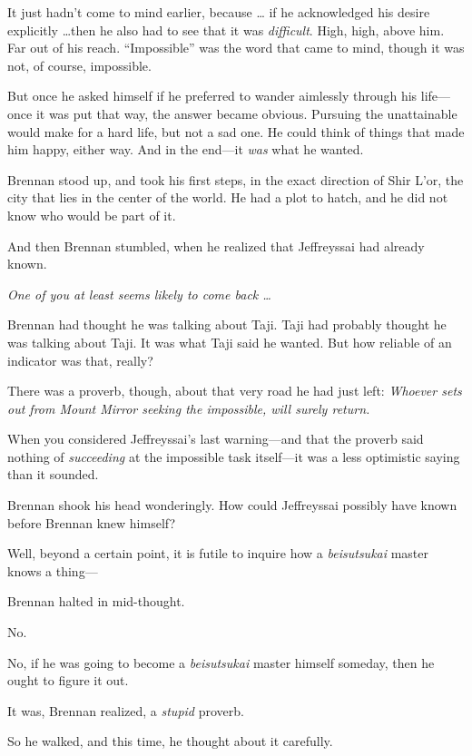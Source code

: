 {
 It just hadn't come to mind earlier, because \ldots
if he acknowledged his desire explicitly \ldots then he also had to see
that it was \textit{difficult}. High, high, above him. Far out of his
reach. ``Impossible'' was the word
that came to mind, though it was not, of course, impossible.}

{
 But once he asked himself if he preferred to wander aimlessly
through his life---once it was put that way, the answer became obvious.
Pursuing the unattainable would make for a hard life, but not a sad
one. He could think of things that made him happy, either way. And in
the end---it \textit{was} what he wanted.}

{
 Brennan stood up, and took his first steps, in the exact direction
of Shir L'or, the city that lies in the center of the
world. He had a plot to hatch, and he did not know who would be part of
it.}

{
 And then Brennan stumbled, when he realized that Jeffreyssai had
already known.}

{
 \textit{One of you at least seems likely to come back \ldots}}

{
 Brennan had thought he was talking about Taji. Taji had probably
thought he was talking about Taji. It was what Taji said he wanted. But
how reliable of an indicator was that, really?}

{
 There was a proverb, though, about that very road he had just
left: \textit{Whoever sets out from Mount Mirror seeking the
impossible, will surely return.}}

{
 When you considered Jeffreyssai's last
warning---and that the proverb said nothing of \textit{succeeding} at
the impossible task itself---it was a less optimistic saying than it
sounded.}

{
 Brennan shook his head wonderingly. How could Jeffreyssai possibly
have known before Brennan knew himself?}

{
 Well, beyond a certain point, it is futile to inquire how a
\textit{beisutsukai} master knows a thing---}

{
 Brennan halted in mid-thought.}

{
 No.}

{
 No, if he was going to become a \textit{beisutsukai} master
himself someday, then he ought to figure it out.}

{
 It was, Brennan realized, a \textit{stupid} proverb.}

{
 So he walked, and this time, he thought about it carefully.}

